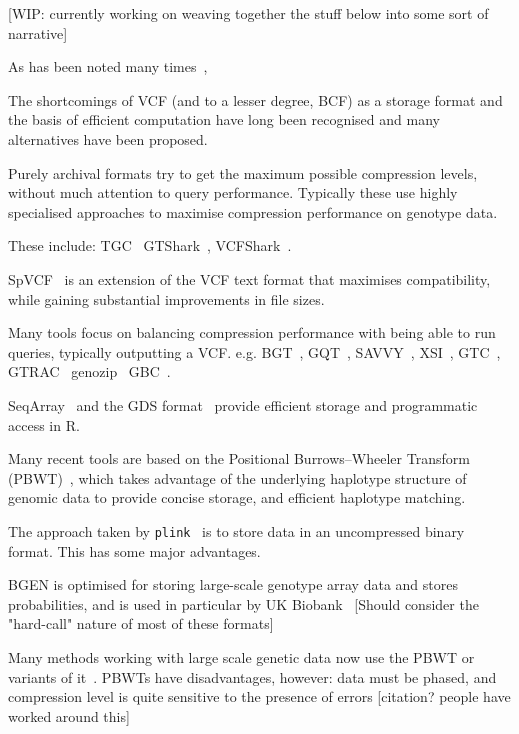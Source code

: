 \documentclass[a4paper,num-refs]{oup-contemporary}
\newcommand{\toolname}[1]{\texttt{#1}}
\begin{document}
[WIP: currently working on weaving together the stuff below into
some sort of narrative]

As has been noted many times~\citep[e.g.][]{kelleher2013processing,layer2016efficient,li2016bgt},

The shortcomings of VCF (and to a lesser degree, BCF) as a storage
format and the basis of efficient computation have long been
recognised
and many alternatives
have been proposed.

Purely archival formats try to get the maximum possible compression levels,
without much attention to query performance. Typically these use
highly specialised approaches to maximise compression performance
on genotype data.

These include:
TGC~\citep{deorowicz2013genome}
GTShark~\citep{deorowicz2019gtshark},
VCFShark~\citep{deorowicz2021vcfshark}.

SpVCF~\citep{lin2020sparse} is an extension of the VCF text
format that maximises compatibility, while gaining substantial
improvements in file sizes.

Many tools focus on balancing compression performance with
being able to run queries, typically outputting a VCF.
e.g.
BGT~\citep{li2016bgt},
GQT~\citep{layer2016efficient},
SAVVY~\citep{lefaive2021sparse},
XSI~\citep{wertenbroek2022xsi},
GTC~\citep{danek2018gtc},
GTRAC~\citep{tatwawadi2016gtrac}
genozip~\citep{lan2020genozip,lan2021genozip}
GBC~\citep{zhang2023gbc}.

SeqArray~\citep{zheng2017seqarray} and the GDS format~\citep{zheng2012high}
provide efficient storage and programmatic access in R.


Many recent tools are based on the Positional Burrows--Wheeler
Transform (PBWT)~\citep{durbin2014efficient}, which takes advantage
of the underlying haplotype structure of genomic data to provide
concise storage, and efficient haplotype matching.

The approach taken by \toolname{plink}~\citep{purcell2007plink,chang2015second} is to
store data in an uncompressed binary format. This has some major
advantages.

BGEN \citep{band2018bgen} is optimised for storing large-scale
genotype array data and stores probabilities, and is used
in particular by UK Biobank~\citep{bycroft2018genome}
[Should consider the "hard-call" nature of most of these formats]

Many methods working with large scale genetic
data now use the PBWT or variants of
it~\citep[e.g.][]{li2016bgt,lefaive2021sparse,wertenbroek2022xsi}. PBWTs have
disadvantages, however: data must be phased, and compression level
is quite sensitive to the presence of errors [citation? people have
worked around this]
\end{document}
